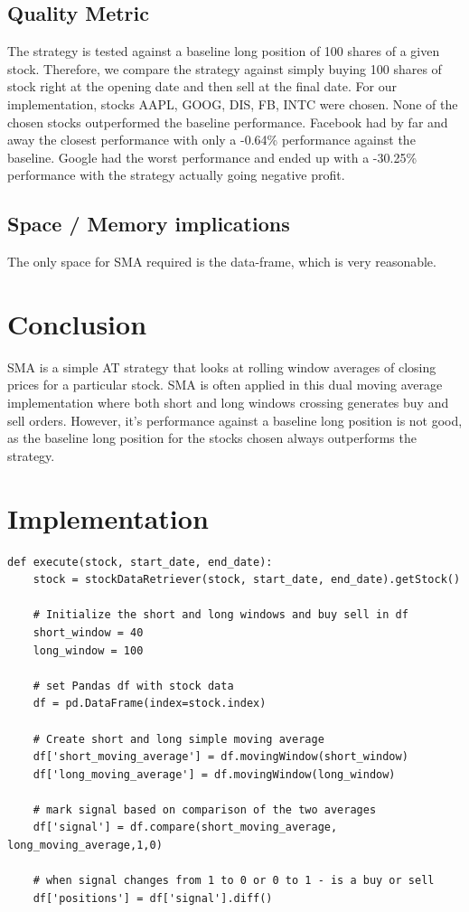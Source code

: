 \documentclass[letterpaper,11pt]{article}
\begin{document}
\subsection*{Quality Metric}
The strategy is tested against a baseline long position of 100 shares of a given stock. Therefore, we compare the strategy against simply buying 100 shares of stock right at the opening date and then sell at the final date. For our implementation, stocks AAPL, GOOG, DIS, FB, INTC were chosen. None of the chosen stocks outperformed the baseline performance. Facebook had by far and away the closest performance with only a -0.64\% performance against the baseline. Google had the worst performance and ended up with a -30.25\% performance with the strategy actually going negative profit.

\subsection*{Space / Memory implications}
The only space for SMA required is the data-frame, which is very reasonable.

\section*{Conclusion}

SMA is a simple AT strategy that looks at rolling window averages of closing prices for a particular stock. SMA is often applied in this dual moving average implementation where both short and long windows crossing generates buy and sell orders. However, it's performance against a baseline long position is not good, as the baseline long position for the stocks chosen always outperforms the strategy. 

\section*{Implementation}
\begin{verbatim}
def execute(stock, start_date, end_date):
    stock = stockDataRetriever(stock, start_date, end_date).getStock()

    # Initialize the short and long windows and buy sell in df
    short_window = 40
    long_window = 100
    
    # set Pandas df with stock data
    df = pd.DataFrame(index=stock.index)

    # Create short and long simple moving average 
    df['short_moving_average'] = df.movingWindow(short_window)
    df['long_moving_average'] = df.movingWindow(long_window)
    
    # mark signal based on comparison of the two averages
    df['signal'] = df.compare(short_moving_average, long_moving_average,1,0)
    
    # when signal changes from 1 to 0 or 0 to 1 - is a buy or sell
    df['positions'] = df['signal'].diff()

\end{verbatim}



\end{document}
